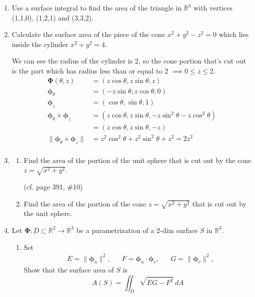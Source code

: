 \documentclass{article}
\newcommand{\norm}[1]{\| #1 \|}
\begin{document}
\begin{enumerate}
    \item Use a surface integral to find the area of the triangle in $\mathbb{R}^3$ with vertices (1,1,0), (1,2,1) and (3,3,2).

    \item Calculate the surface area of the piece of the cone $x^2+y^2-z^2 =0$ which lies inside the cylinder $x^2 + y^2 = 4$.
    
    We can see the radius of the cylinder is 2, so the cone portion that's cut out is the part which has radius less than or equal to 2 $\implies 0 \leq z \leq 2$.
    \begin{align*}
        \boldsymbol \Phi (\theta, z) &= (z\cos \theta, z\sin \theta, z) \\
        \boldsymbol \phi_\theta &= (- z \sin \theta, z \cos \theta, 0) \\
        \boldsymbol \phi_z &= ( \cos \theta, \sin \theta, 1) \\
        \boldsymbol \phi_\theta \times \boldsymbol \phi_z &= (z \cos \theta, z \sin \theta, - z \sin^2 \theta - z \cos^2 \theta) \\
        &= (z \cos \theta, z \sin \theta, - z)  \\
        \norm {\boldsymbol \phi_\theta \times \boldsymbol \phi_z }&= z^2 \cos^2 \theta + z^2 \sin^2 \theta + z^2  = 2 z^2\\
    \end{align*}
    \item
    \begin{enumerate}
        \item Find the area of the portion of the unit sphere that is cut out by the cone $z = \sqrt{x^2+y^2}$.

        (cf. page 391, \#10)

        \item Find the area of the portion of the cone $z = \sqrt{x^2+y^2}$ that is cut out by the unit sphere.
    \end{enumerate}

    \item Let $\boldsymbol \Phi : D \subset \mathbb{R}^2 \rightarrow \mathbb{R}^3$ be a parametrization of a 2-dim surface $S$ in $\mathbb{R}^3$.
    \begin{enumerate}
        \item Set
        \begin{align*}
            & E = \norm{\boldsymbol \phi_u}^2,& &F = \boldsymbol \phi_u \cdot \boldsymbol \phi_v, & & G = \norm{\boldsymbol \phi_v}^2,
        \end{align*} 
        Show that the surface area of $S$ is 
        \[ A(S) = \iint_D \sqrt{EG - F^2}\,dA \]
        

\end{enumerate}
\end{enumerate}
\end{document}
